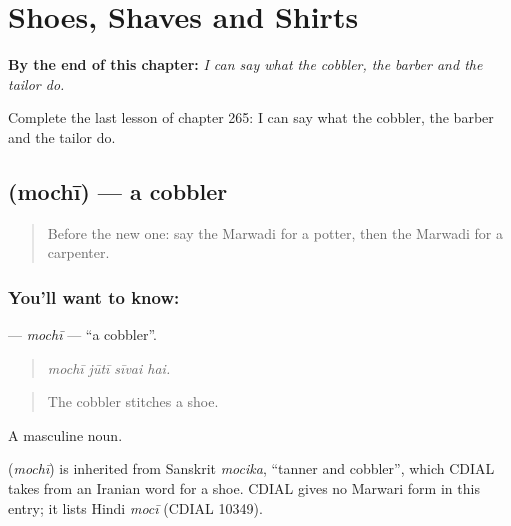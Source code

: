 
\chapter{Shoes, Shaves and Shirts}
\label{ch:mw-shoes-shaves-and-shirts}

\begin{chapteropening}
\textbf{By the end of this chapter:} \emph{I can say what the cobbler, the barber and the tailor do.}

Complete the last lesson of chapter 265: I can say what the cobbler, the barber and the tailor do.
\end{chapteropening}

\section[\texorpdfstring{\mw{मोची} (mochī)}{मोची (mochī)}]{ (mochī) — a cobbler}

\label{lesson:MW-C265-mochi}



\begin{quote}
Before the new one: say the Marwadi for a potter, then the Marwadi for a carpenter.
\end{quote}

\subsection*{You'll want to know: }
\textbf{} — \emph{mochī} — \textquotedblleft{}a cobbler\textquotedblright{}.

\begin{quote}
   
\end{quote}

\begin{quote}
\emph{mochī jūtī sīvai hai.}
\end{quote}

\begin{quote}
The cobbler stitches a shoe.
\end{quote}

A masculine noun.

\begin{cousinweb}
\textbf{} (\emph{mochī}) is inherited from Sanskrit \emph{mocika}, \textquotedblleft{}tanner and cobbler\textquotedblright{}, which CDIAL takes from an Iranian word for a shoe. CDIAL gives no Marwari form in this entry; it lists Hindi \emph{mocī} (CDIAL 10349).
\end{cousinweb}

